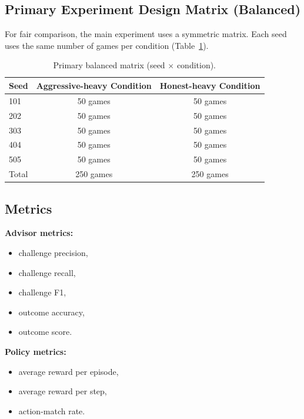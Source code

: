 \documentclass[11pt]{article}
\begin{document}
\subsection{Primary Experiment Design Matrix (Balanced)}
For fair comparison, the main experiment uses a symmetric matrix. Each seed uses the same number of games per condition (Table~\ref{tab:exp-matrix-primary}).

\begin{table}[H]
\centering
\caption{Primary balanced matrix (seed $\times$ condition).}
\label{tab:exp-matrix-primary}
\begin{tabular}{lcc}
\toprule
Seed & Aggressive-heavy Condition & Honest-heavy Condition \\
\midrule
101 & 50 games & 50 games \\
202 & 50 games & 50 games \\
303 & 50 games & 50 games \\
404 & 50 games & 50 games \\
505 & 50 games & 50 games \\
\midrule
Total & 250 games & 250 games \\
\bottomrule
\end{tabular}
\end{table}

\subsection{Metrics}
\noindent
\begin{minipage}[t]{0.48\textwidth}
  \textbf{Advisor metrics:}
  \begin{itemize}
    \item challenge precision,
    \item challenge recall,
    \item challenge F1,
    \item outcome accuracy,
    \item outcome score.
  \end{itemize}
\end{minipage}%
\hfill
\begin{minipage}[t]{0.48\textwidth}
  \textbf{Policy metrics:}
  \begin{itemize}
    \item average reward per episode,
    \item average reward per step,
    \item action-match rate.
  \end{itemize}
\end{minipage}
\end{document}
